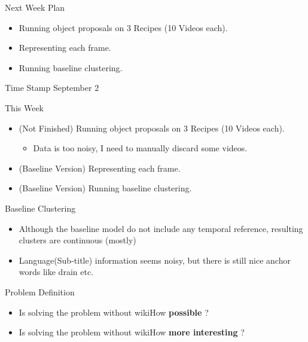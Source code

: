 \begin{frame}{Next Week Plan}
\begin{itemize}
\item Running object proposals on 3 Recipes (10 Videos each).
\item Representing each frame.
\item Running baseline clustering.
\end{itemize}
\end{frame}

\begin{frame}{Time Stamp}
September 2
\end{frame}

\begin{frame}{This Week}
\begin{itemize}
\item (Not Finished) Running object proposals on 3 Recipes (10 Videos each).
\begin{itemize}
\item Data is too noisy, I need to manually discard some videos.
\end{itemize}
\item (Baseline Version) Representing each frame.
\item (Baseline Version) Running baseline clustering.
\end{itemize}
\end{frame}

\begin{frame}{Baseline Clustering}
\begin{itemize}
\item Although the baseline model do not include any temporal reference, resulting clusters are continuous (mostly)
\item Language(Sub-title) information seems noisy, but there is still nice anchor words like drain etc.
\end{itemize}
\end{frame}

\begin{frame}{Problem Definition}
\begin{itemize}
\item Is solving the problem without wikiHow {\bf possible} ?
\item Is solving the problem without wikiHow {\bf more interesting} ?
\end{itemize}
\end{frame}


